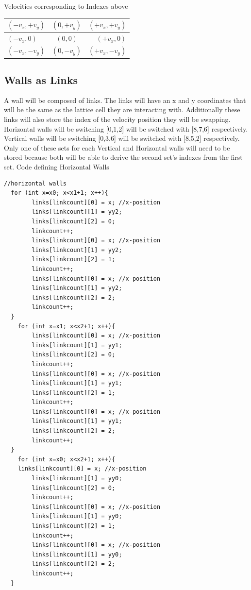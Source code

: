 \documentclass{article}
\begin{document}
\begin{center}
Velocities corresponding to Indexes above ~
\begin{tabular}{l c r}
	\hline
	$(-v_x,+v_y)$ & $(0,+v_y)$ & $(+v_x,+v_y)$ \\ \hline
	$(-v_x,0)$ & $(0,0)$ & $(+v_x,0)$ \\ \hline
	$(-v_x,-v_y)$ & $(0,-v_y)$ & $(+v_x,-v_y)$ \\ 
	\hline
\end{tabular}
\end{center}

\subsection{Walls as Links}
A wall will be composed of links. The links will have an x and y coordinates that will be the same as the lattice cell they are interacting with. Additionally these links will also store the index of the velocity position they will be swapping. Horizontal walls will be switching [0,1,2] will be switched with [8,7,6] respectively. Vertical walls will be switching [0,3,6] will be switched with [8,5,2] respectively. Only one of these sets for each Vertical and Horizontal walls will need to be stored because both will be able to derive the second set's indexes from the first set. 
\vspace{5mm}
Code defining Horizontal Walls 
\vspace{5mm}
\begin{verbatim}
//horizontal walls
  for (int x=x0; x<x1+1; x++){
    	links[linkcount][0] = x; //x-position
    	links[linkcount][1] = yy2;
    	links[linkcount][2] = 0;
    	linkcount++;
    	links[linkcount][0] = x; //x-position
    	links[linkcount][1] = yy2;
    	links[linkcount][2] = 1;
    	linkcount++;
    	links[linkcount][0] = x; //x-position 
    	links[linkcount][1] = yy2;
    	links[linkcount][2] = 2;
    	linkcount++;
  }
    for (int x=x1; x<x2+1; x++){
    	links[linkcount][0] = x; //x-position
    	links[linkcount][1] = yy1;
    	links[linkcount][2] = 0;
    	linkcount++;
    	links[linkcount][0] = x; //x-position
    	links[linkcount][1] = yy1;
    	links[linkcount][2] = 1;
    	linkcount++;
    	links[linkcount][0] = x; //x-position
    	links[linkcount][1] = yy1;
    	links[linkcount][2] = 2;
    	linkcount++;
  }
    for (int x=x0; x<x2+1; x++){
	links[linkcount][0] = x; //x-position
        links[linkcount][1] = yy0;
        links[linkcount][2] = 0;
        linkcount++;
        links[linkcount][0] = x; //x-position
        links[linkcount][1] = yy0;
        links[linkcount][2] = 1;
        linkcount++;
        links[linkcount][0] = x; //x-position
        links[linkcount][1] = yy0;
        links[linkcount][2] = 2;
        linkcount++;
  }
\end{verbatim}
\end{document}

